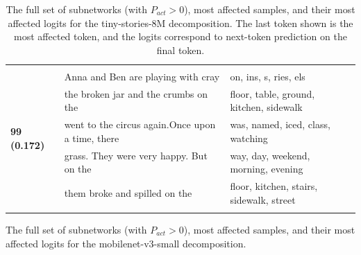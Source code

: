 \documentclass{article}
\theoremstyle{plain}
\theoremstyle{definition}
\theoremstyle{remark}
\begin{document}
\begin{longtable}{|p{}|p{}|p{}|}
& & \\
\multirow{5}{*}{\textbf{99 (0.172)}} & Anna and Ben are playing with cray & on, ins, s, ries, els \\
& the broken jar and the crumbs on the & floor,  table,  ground,  kitchen,  sidewalk \\
& went to the circus again.Once upon a time, there & was, named, iced, class, watching \\
& grass. They were very happy.  But on the & way,  day,  weekend,  morning,  evening \\
& them broke and spilled on the & floor,  kitchen,  stairs,  sidewalk,  street \\
\caption{The full set of subnetworks (with $P_{act}>0$), most affected samples, and their most affected logits for the tiny-stories-8M decomposition. The last token shown is the most affected token, and the logits correspond to next-token prediction on the final token.}\label{tab:transformer_full}
\end{longtable}
\normalsize




\label{fig:cnn_all}
The full set of subnetworks (with $P_{act}>0$), most affected samples, and their most affected logits for the mobilenet-v3-small decomposition.
\end{document}
